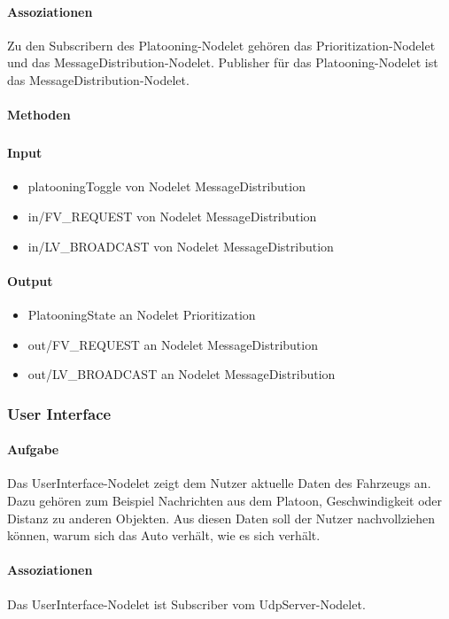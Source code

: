 \documentclass[a4paper, 12pt, titlepage]{scrartcl}
\begin{document}
				\paragraph{Assoziationen} Zu den Subscribern des Platooning-Nodelet gehören das Prioritization-Nodelet und das MessageDistribution-Nodelet. Publisher für das Platooning-Nodelet ist das MessageDistribution-Nodelet. 
				\paragraph{Methoden}
					\subparagraph{} 
				\paragraph{Input} 
				    \begin{itemize}
    					\item platooningToggle von Nodelet MessageDistribution
    					\item in/FV\_REQUEST von Nodelet MessageDistribution
    					\item in/LV\_BROADCAST von Nodelet MessageDistribution
    				\end{itemize}
				\paragraph{Output}
					\begin{itemize}
    					\item PlatooningState an Nodelet Prioritization
    					\item out/FV\_REQUEST an Nodelet MessageDistribution
    					\item out/LV\_BROADCAST an Nodelet MessageDistribution
    				\end{itemize}
						
		    \subsubsection{User Interface}
			\label{user_interfcae}
				\paragraph{Aufgabe} Das UserInterface-Nodelet zeigt dem Nutzer aktuelle Daten des Fahrzeugs an. Dazu gehören zum Beispiel Nachrichten aus dem Platoon, Geschwindigkeit oder Distanz zu anderen Objekten. Aus diesen Daten soll der Nutzer nachvollziehen können, warum sich das Auto verhält, wie es sich verhält.
				\paragraph{Assoziationen} Das UserInterface-Nodelet ist Subscriber vom UdpServer-Nodelet.
\end{document}
